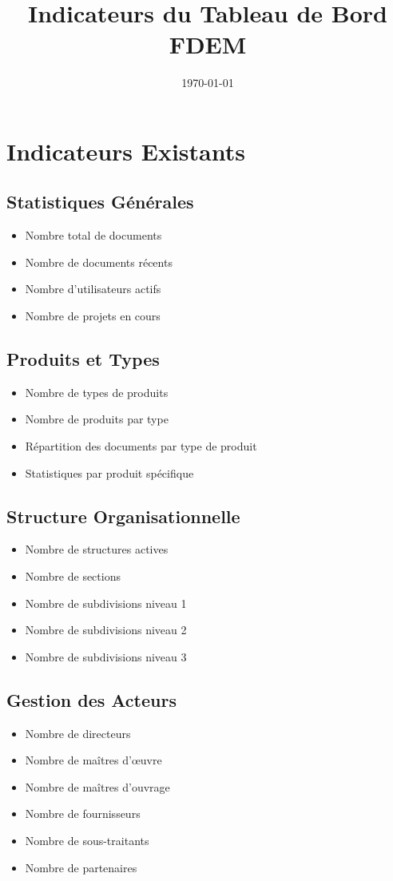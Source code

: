 \documentclass[12pt,a4paper]{article}
\title{Indicateurs du Tableau de Bord FDEM}
\author{}
\date{\today}
\begin{document}
\maketitle

\section{Indicateurs Existants}

\subsection{Statistiques Générales}
\begin{itemize}
    \item Nombre total de documents
    \item Nombre de documents récents
    \item Nombre d'utilisateurs actifs
    \item Nombre de projets en cours
\end{itemize}

\subsection{Produits et Types}
\begin{itemize}
    \item Nombre de types de produits
    \item Nombre de produits par type
    \item Répartition des documents par type de produit
    \item Statistiques par produit spécifique
\end{itemize}

\subsection{Structure Organisationnelle}
\begin{itemize}
    \item Nombre de structures actives
    \item Nombre de sections
    \item Nombre de subdivisions niveau 1
    \item Nombre de subdivisions niveau 2
    \item Nombre de subdivisions niveau 3
\end{itemize}

\subsection{Gestion des Acteurs}
\begin{itemize}
    \item Nombre de directeurs
    \item Nombre de maîtres d'œuvre
    \item Nombre de maîtres d'ouvrage
    \item Nombre de fournisseurs
    \item Nombre de sous-traitants
    \item Nombre de partenaires
\end{itemize}
\end{document}
